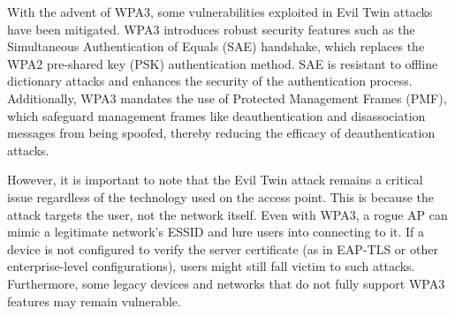 With the advent of WPA3, some vulnerabilities exploited in Evil Twin attacks have been mitigated. WPA3 introduces robust security features such as the Simultaneous Authentication of Equals (SAE) handshake, which replaces the WPA2 pre-shared key (PSK) authentication method. SAE is resistant to offline dictionary attacks and enhances the security of the authentication process. Additionally, WPA3 mandates the use of Protected Management Frames (PMF), which safeguard management frames like deauthentication and disassociation messages from being spoofed, thereby reducing the efficacy of deauthentication attacks.

However, it is important to note that the Evil Twin attack remains a critical issue regardless of the technology used on the access point. This is because the attack targets the user, not the network itself. Even with WPA3, a rogue AP can mimic a legitimate network’s ESSID and lure users into connecting to it. If a device is not configured to verify the server certificate (as in EAP-TLS or other enterprise-level configurations), users might still fall victim to such attacks. Furthermore, some legacy devices and networks that do not fully support WPA3 features may remain vulnerable.

